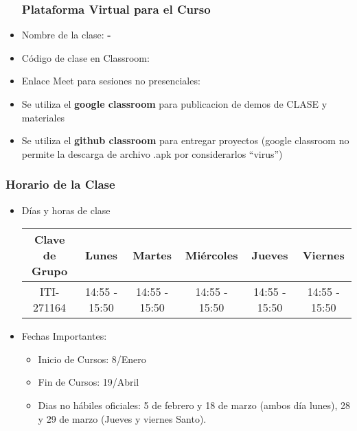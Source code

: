 


\begin{frame}
\begin{itemize}
\frametitle{Plataforma Virtual para el Curso}
\item Nombre de la clase: \textbf{\nombreMateria-\cuatrimestre}
\item Código de clase en Classroom: \textbf{\claveClassroom}
\item Enlace Meet para sesiones no presenciales: \textbf{\claveMeet}
\item Se utiliza el \textbf{google classroom} para publicacion de demos de CLASE y materiales
\item Se utiliza el \textbf{github classroom} para entregar proyectos (google classroom no permite la descarga de archivo .apk por considerarlos ``virus'')
\end{itemize}
\end{frame}



\begin{frame}
\frametitle{Horario de la Clase}


\begin{itemize}
\item Días y horas de clase
\tiny
\begin{spacing}{1.0}
\begin{center}
\begin{tabular}{c|ccccc}
\hline 
\textbf{Clave de Grupo}   & Lunes         & Martes        & Miércoles     & Jueves        & Viernes          \\ \hline 
ITI-271164                & 14:55 - 15:50 & 14:55 - 15:50 & 14:55 - 15:50 & 14:55 - 15:50 & 14:55 - 15:50    \\ \hline     
\hline
\end{tabular}
\end{center}
\end{spacing}
\normalsize
\item Fechas Importantes:
\begin{itemize}
\item Inicio de Cursos: 8/Enero
\item Fin de Cursos: 19/Abril
\item Dias no hábiles oficiales: 5 de febrero y 18 de marzo (ambos d\'ia lunes), 28 y 29 de marzo (Jueves y viernes Santo). 
\end{itemize}
\end{itemize}

\end{frame}


